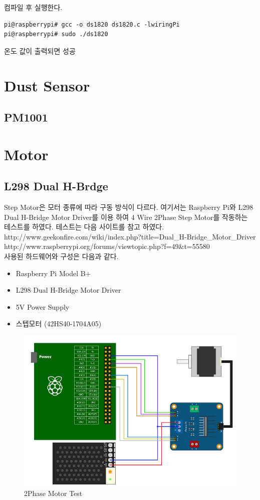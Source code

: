 \documentclass[11pt
  , a4paper
  , article
  , oneside
]{memoir}
\begin{document}
컴파일 후 실행한다.
\begin{lstlisting}[style=termstyle]
pi@raspberrypi# gcc -o ds1820 ds1820.c -lwiringPi
pi@raspberrypi# sudo ./ds1820
\end{lstlisting}
온도 값이 출력되면 성공
\section{Dust Sensor}
\subsection{PM1001}
\section{Motor}
\subsection{L298 Dual H-Brdge}
Step Motor은 모터 종류에 따라 구동 방식이 다르다. 여기서는 Raspberry Pi와 
L298 Dual H-Bridge Motor Driver를 이용 하여 4 Wire 2Phase Step Motor를 작동하는 테스트를 하였다.
테스트는 다음 사이트를 참고 하였다.\\
http://www.geekonfire.com/wiki/index.php?title=Dual\_H-Bridge\_Motor\_Driver\\
http://www.raspberrypi.org/forums/viewtopic.php?f=49\&t=55580\\
사용된 하드웨어와 구성은 다음과 같다.
\begin{itemize}
\item Raspberry Pi Model B+
\item L298 Dual H-Bridge Motor Driver
\item 5V Power Supply
\item 스텝모터 (42HS40-1704A05)
\end{itemize}
\begin{figure}[!htb]
\centering
\includegraphics[width=1\textwidth]{./images/raspberry/L298Test.png}
\caption{2Phase Motor Test}
\label{fig:l298_test}
\end{figure}
\end{document}
